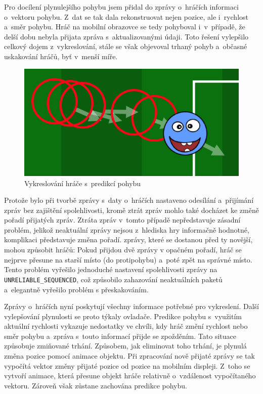 \documentclass[thesis=B,czech,hidelinks]{FITthesis}[2012/06/26] %
\newcommand{\code}[1]{\texttt{#1}}
\begin{document}
Pro docílení plynulejšího pohybu jsem přidal do zprávy o~hráčích informaci o~vektoru pohybu. Z~dat se tak dala rekonstruovat nejen pozice, ale i~rychlost a~směr pohybu. Hráč na mobilní obrazovce se tedy pohyboval i~v~případě, že delší dobu nebyla přijata zpráva s~aktualizovanými údaji. Toto řešení vylepšilo celkový dojem z~vykreslování, stále se však objevoval trhaný pohyb a~občasné uskakování hráčů, byť v~menší míře.

\begin{figure}[h]
\center
\includegraphics[width=\textwidth]{player_rendering_2}
\caption{Vykreslování hráče s~predikcí pohybu}
\label{picture:player_rendering_2}
\end{figure}

Protože bylo při tvorbě zprávy s~daty o~hráčích nastaveno odesílání a~přijímání zpráv bez zajištění spolehlivosti, kromě ztrát zpráv mohlo také docházet ke změně pořadí přijatých zpráv. Ztráta zpráv v~tomto případě nepředstavuje zásadní problém, jelikož neaktuální zprávy nejsou z~hlediska hry informačně hodnotné, komplikaci představuje změna pořadí.  zprávy, které se dostanou před ty novější, mohou způsobit  hráčů: Pokud přijdou dvě zprávy v opačném pořadí, hráč se nejprve přesune na starší místo (do protipohybu) a~poté zpět na správné místo. Tento problém vyřešilo jednoduché nastavení spolehlivosti zprávy na \code{UNRELIABLE\_SEQUENCED}, což způsobilo zahazování neaktuálních paketů a~elegantně vyřešilo problém s přeskakováním.

Zprávy o~hráčích nyní poskytují všechny informace potřebné pro vykreslení. Další vylepšování plynulosti se proto týkaly ovladače. Predikce pohybu s~využitím aktuální rychlosti vykazuje nedostatky ve chvíli, kdy hráč změní rychlost nebo směr pohybu a~zpráva s~touto informací přijde se zpožděním. Tato situace způsobuje zmiňované trhání. Způsobem, jak eliminovat toho trhání, je plynulá změna pozice pomocí animace objektu. Při zpracování nově přijaté zprávy se tak vypočítá vektor změny přijaté pozice od pozice na mobilním displeji. Z~toho se vytvoří animace, která přesune objekt hráče relativně o~vzdálenost vypočítaného vektoru. Zároveň však zůstane zachována predikce pohybu. 
\end{document}
